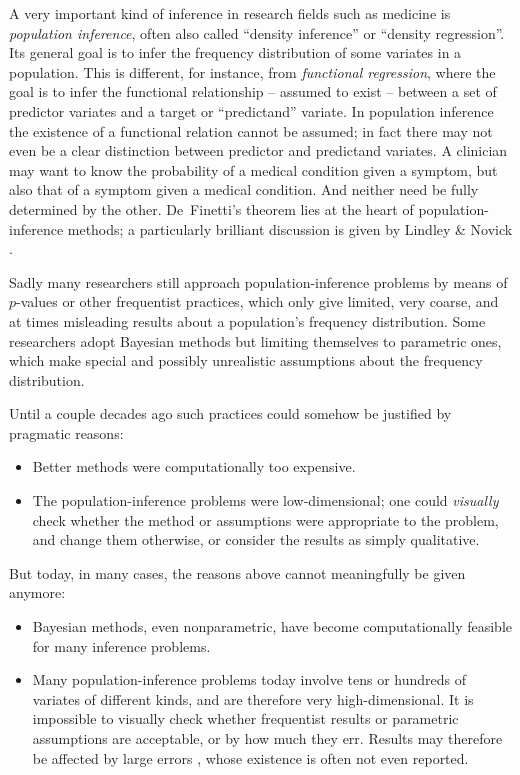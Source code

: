 \documentclass{article}
\begin{document}
A very important kind of inference in research fields such as medicine is \emph{population inference}, often also called ``density inference'' or ``density regression''. Its general goal is to infer the frequency distribution of some variates in a population. This is different, for instance, from \emph{functional regression}, where the goal is to infer the functional relationship -- assumed to exist -- between a set of predictor variates and a target or ``predictand'' variate. In population inference  the existence of a functional relation cannot be assumed; in fact there may not even be a clear distinction between predictor and predictand variates. A clinician may want to know the probability of a medical condition given a symptom, but also that of a symptom given a medical condition. And neither need be fully determined by the other. De~Finetti's theorem \citep[see e.g.][\S\S\,4.2, 4.3, 4.6]{bernardoetal1994_r2000} lies at the heart of population-inference methods; a particularly brilliant discussion is given by Lindley \& Novick \citeyearpar{lindleyetal1981}.

Sadly many researchers still approach population-inference problems by means of $p$-values or other frequentist practices, which only give limited, very coarse, and at times misleading results about a population's frequency distribution. Some researchers adopt Bayesian methods but limiting themselves to parametric ones, which make special and possibly unrealistic assumptions about the frequency distribution.

Until a couple decades ago such practices could somehow be justified by pragmatic reasons:
\begin{itemize}
\item Better methods were computationally too expensive.
\item The population-inference problems were low-dimensional; one could \emph{visually} check whether the method or assumptions were appropriate to the problem, and change them otherwise, or consider the results as simply qualitative.
\end{itemize}

But today, in many cases, the reasons above cannot meaningfully be given anymore:
\begin{itemize}
\item Bayesian methods, even nonparametric, have become computationally feasible for many inference problems.
\item Many population-inference problems today involve tens or hundreds of variates of different kinds, and are therefore very high-dimensional. It is impossible to visually check whether frequentist results or parametric assumptions are acceptable, or by how much they err. Results may therefore be affected by large errors \citep{draper1995}, whose existence is often not even reported.
\end{itemize}
\end{document}
